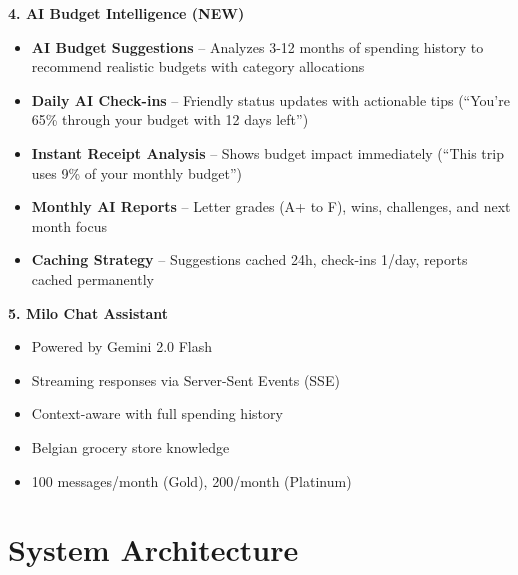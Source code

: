 \documentclass[11pt,a4paper]{report}
\begin{document}
\textbf{4. AI Budget Intelligence (NEW)}

\begin{itemize}[leftmargin=2em, itemsep=3pt]
    \item \textbf{AI Budget Suggestions} -- Analyzes 3-12 months of spending history to recommend realistic budgets with category allocations
    \item \textbf{Daily AI Check-ins} -- Friendly status updates with actionable tips (``You're 65\% through your budget with 12 days left'')
    \item \textbf{Instant Receipt Analysis} -- Shows budget impact immediately (``This trip uses 9\% of your monthly budget'')
    \item \textbf{Monthly AI Reports} -- Letter grades (A+ to F), wins, challenges, and next month focus
    \item \textbf{Caching Strategy} -- Suggestions cached 24h, check-ins 1/day, reports cached permanently
\end{itemize}

\textbf{5. Milo Chat Assistant}

\begin{itemize}[leftmargin=2em, itemsep=3pt]
    \item Powered by Gemini 2.0 Flash
    \item Streaming responses via Server-Sent Events (SSE)
    \item Context-aware with full spending history
    \item Belgian grocery store knowledge
    \item 100 messages/month (Gold), 200/month (Platinum)
\end{itemize}

\section{System Architecture}
\end{document}
